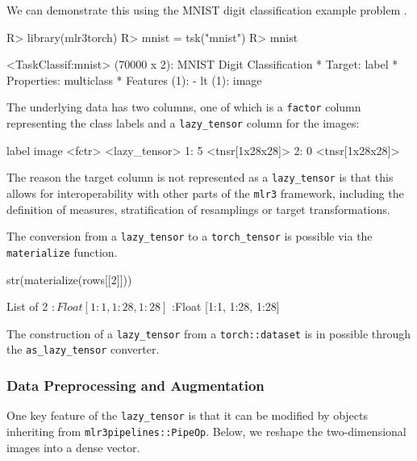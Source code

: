 \documentclass[article, nojss]{jss}
\theoremstyle{definition}
\begin{document}
We can demonstrate this using the MNIST digit classification example problem \citep{ref-mnist}.

\begin{CodeInput}
R> library(mlr3torch)
R> mnist = tsk("mnist")
R> mnist
\end{CodeInput}
\begin{CodeOutput}
<TaskClassif:mnist> (70000 x 2): MNIST Digit Classification
* Target: label
* Properties: multiclass
* Features (1):
  - lt (1): image
\end{CodeOutput}

The underlying data has two columns, one of which is a \texttt{factor} column representing the class labels and a \texttt{lazy\_tensor} column for the images:

\begin{CodeOutput}
  label           image
 <fctr>    <lazy_tensor>
1:    5  <tnsr[1x28x28]>
2:    0  <tnsr[1x28x28]>
\end{CodeOutput}

The reason the target column is not represented as a \texttt{lazy\_tensor} is that this allows for interoperability with other parts of the \texttt{mlr3} framework, including the definition of measures, stratification of resamplings or target transformations.

The conversion from a \texttt{lazy\_tensor} to a \texttt{torch\_tensor} is possible via the \texttt{materialize} function.

\begin{CodeInput}
str(materialize(rows[[2]]))
\end{CodeInput}
\begin{CodeOutput}
List of 2
 $ :Float [1:1, 1:28, 1:28]
 $ :Float [1:1, 1:28, 1:28]
\end{CodeOutput}

The construction of a \texttt{lazy\_tensor} from a \texttt{torch::dataset} is in possible through the \texttt{as\_lazy\_tensor} converter.

\subsubsection{Data Preprocessing and Augmentation}

One key feature of the \texttt{lazy\_tensor} is that it can be modified by objects inheriting from \texttt{mlr3pipelines::PipeOp}.
Below, we reshape the two-dimensional images into a dense vector.
\end{document}
